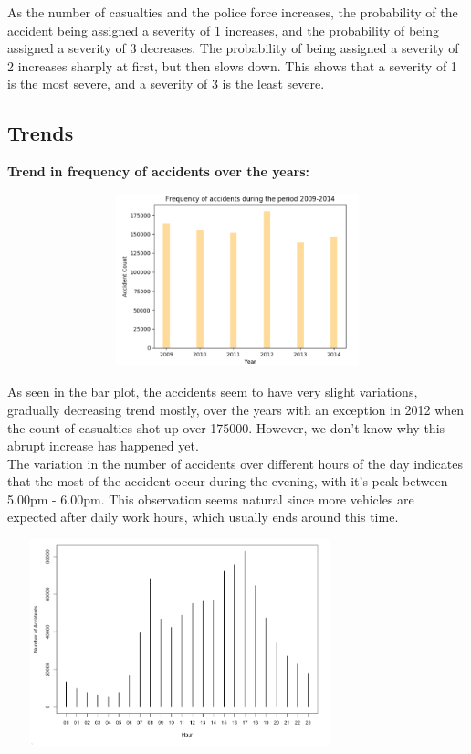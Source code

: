 \documentclass[a4paper, 10pt]{article}
\begin{document}
As the number of casualties and the police force increases, the probability of the accident being assigned a severity of 1 increases, and the probability of being assigned a severity of 3 decreases. The probability of being assigned a severity of 2 increases sharply at first, but then slows down. This shows that a severity of 1 is the most severe, and a severity of 3 is the least severe. \\

 \subsection{Trends}
   
   \textbf{Trend in frequency of accidents over the years:}

   \begin{center}
     \includegraphics[width=20cm,height=5cm, scale=0.8,keepaspectratio]{counts.png}
   \end{center}

   As seen in the bar plot, the accidents seem to have very slight variations, gradually decreasing trend mostly, over the years with an exception in 2012 when the count of casualties
   shot up over 175000. However, we don't know why this abrupt increase has happened yet. \\

   The variation in the number of accidents over different hours of the day indicates that the most of the accident occur during the evening, with it's peak between 5.00pm - 6.00pm.
   This observation seems natural since more vehicles are expected after daily work hours, which usually ends around this time. \\
   
   \begin{center}
     \includegraphics[width=10cm,height=6cm, scale=0.8,keepaspectratio]{hour-study.png}
   \end{center}
\end{document}
